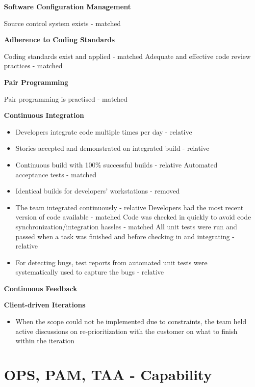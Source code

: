 \begin{appendices}
\textbf{Software Configuration Management}
\begin{itemize}
	\taa Source control system exists - matched
\end{itemize}

\textbf{Adherence to Coding Standards}
\begin{itemize}
	\taa Coding standards exist and applied - matched
	\taa Adequate and effective code review practices - matched
\end{itemize}

\textbf{Pair Programming}
\begin{itemize}
	\taa Pair programming is practised - matched
\end{itemize}

\textbf{Continuous Integration}
\begin{itemize}
	\item Developers integrate code multiple times per day - relative
	\item Stories accepted and demonstrated on integrated build - relative
	\item Continuous build with 100\% successful builds - relative
	\taa Automated acceptance tests - matched
	\item Identical builds for developers' workstations - removed
	\item The team integrated continuously - relative
	\pam Developers had the most recent version of code available - matched
	\pam Code was checked in quickly to avoid code synchronization/integration hassles - matched
	\pam All unit tests were run and passed when a task was finished and before checking in and integrating - relative
	\item For detecting bugs, test reports from automated unit tests were systematically used to capture the bugs - relative
\end{itemize}

\textbf{Continuous Feedback}


\textbf{Client-driven Iterations}
\begin{itemize}
	\pam The customer picked the priority of the requirements in the iteration plan
	\item When the scope could not be implemented due to constraints, the team held  active discussions on re-prioritization with the customer on what to finish within the iteration 
\end{itemize}




\section{OPS, PAM, TAA - Capability}


\end{appendices}
